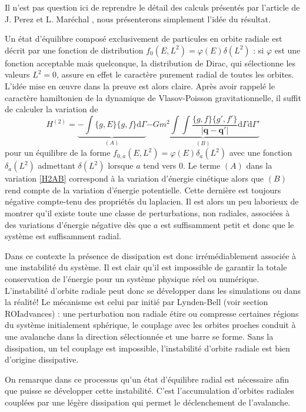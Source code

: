 Il n'est pas question ici de reprendre le détail des calculs présentés par l'article de J. Perez et L. Maréchal \cite{future}, nous présenterons simplement l'idée du résultat.

Un état d'équilibre composé exclusivement de particules en orbite radiale est décrit par une fonction de distribution $f_0(E,L^2) = \varphi(E) \delta(L^2)$ : si $\varphi$ est une fonction acceptable mais quelconque, la distribution de Dirac, qui sélectionne les valeurs $L^2=0$,  assure en effet le caractère purement radial de toutes les orbites.
L'idée mise en \oe uvre dans la preuve est alors claire. Après avoir rappelé le caractère hamiltonien de la dynamique de Vlasov-Poisson 
gravitationnelle, il suffit de calculer la variation de 
\begin{equation}
	H^{(2)} =
	\underbrace{- \int \{g,E\} \{g,f\} \mathrm{d} \Gamma}_{(A)}
	\underbrace{- G m^2 %
		\int\!\!\!\int \frac{\{g,f\}\{g',f'\}}{|\mathbf{q} - \mathbf{q'}|}
		\mathrm{d} \Gamma \mathrm{d} \Gamma'}_{(B)}
		\label{H2AB}
\end{equation}
 pour un équilibre de la forme $f_{0,a}(E,L^2) = \varphi(E) \delta_a (L^2)$ avec une fonction $\delta_a (L^2)$ admettant $\delta(L^2)$ lorsque $a$ tend vers 0. Le terme $(A)$ dans la variation \ref{H2AB} correspond à la variation d'énergie cinétique alors que $(B)$ rend compte de la variation d'énergie potentielle. Cette dernière est toujours négative compte-tenu des propriétés du laplacien.
Il est alors un peu laborieux de montrer qu'il existe toute une classe de perturbations, non radiales, associées à des variations d'énergie négative dès que $a$ est suffisamment petit et donc que le système est suffisamment radial.

Dans ce contexte la présence de dissipation est donc irrémédiablement associée à une instabilité du système. Il est clair qu'il est impossible de garantir la totale conservation de l'énergie pour un système physique réel ou numérique. L'instabilité d'orbite radiale peut donc se développer dans les simulations ou dans la réalité! Le mécanisme est celui par initié par Lynden-Bell (voir section {ROIadvances}) : une perturbation non radiale étire ou compresse certaines régions du système initialement sphérique, le couplage avec les orbites proches conduit à une avalanche dans la direction sélectionnée et une barre se forme. Sans la dissipation, un tel couplage est impossible, l'instabilité d'orbite radiale est bien d'origine dissipative. 

On remarque dans ce processus qu'un état d'équilibre radial est nécessaire afin que puisse se développer cette instabilité. 
C'est l'accumulation d'orbites radiales couplées par une légère dissipation qui permet le déclenchement de l'avalanche.   

 


